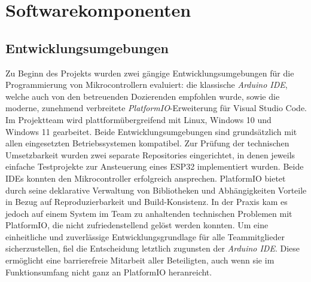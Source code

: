 \chapter{Softwarekomponenten}

\section{Entwicklungsumgebungen}

Zu Beginn des Projekts wurden zwei gängige Entwicklungsumgebungen für die Programmierung von Mikrocontrollern evaluiert: die klassische \textit{Arduino IDE}, welche auch von den betreuenden Dozierenden empfohlen wurde, sowie die moderne, zunehmend verbreitete \textit{PlatformIO}-Erweiterung für Visual Studio Code.
Im Projektteam wird plattformübergreifend mit Linux, Windows 10 und Windows 11 gearbeitet. Beide Entwicklungsumgebungen sind grundsätzlich mit allen eingesetzten Betriebssystemen kompatibel. Zur Prüfung der technischen Umsetzbarkeit wurden zwei separate Repositories eingerichtet, in denen jeweils einfache Testprojekte zur Ansteuerung eines ESP32 implementiert wurden.
Beide IDEs konnten den Mikrocontroller erfolgreich ansprechen. PlatformIO bietet durch seine deklarative Verwaltung von Bibliotheken und Abhängigkeiten Vorteile in Bezug auf Reproduzierbarkeit und Build-Konsistenz. In der Praxis kam es jedoch auf einem System im Team zu anhaltenden technischen Problemen mit PlatformIO, die nicht zufriedenstellend gelöst werden konnten.
Um eine einheitliche und zuverlässige Entwicklungsgrundlage für alle Teammitglieder sicherzustellen, fiel die Entscheidung letztlich zugunsten der \textit{Arduino IDE}. Diese ermöglicht eine barrierefreie Mitarbeit aller Beteiligten, auch wenn sie im Funktionsumfang nicht ganz an PlatformIO heranreicht.

